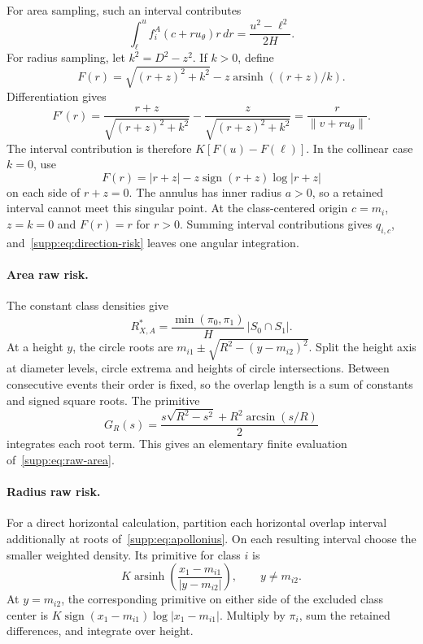 For area sampling, such an interval contributes
\begin{equation}
 \int_\ell^u f_i^A(c+ru_\theta)r\,dr
 =\frac{u^2-\ell^2}{2H}.
 \label{supp:eq:area-primitive}
\end{equation}
For radius sampling, let $k^2=D^2-z^2$. If $k>0$, define
\begin{equation}
 F(r)=\sqrt{(r+z)^2+k^2}
       -z\operatorname{arsinh}((r+z)/k).
 \label{supp:eq:radius-primitive}
\end{equation}
Differentiation gives
\[
 F'(r)=\frac{r+z}{\sqrt{(r+z)^2+k^2}}
        -\frac z{\sqrt{(r+z)^2+k^2}}
       =\frac r{\|v+ru_\theta\|}.
\]
The interval contribution is therefore $K[F(u)-F(\ell)]$. In the collinear case $k=0$, use
\begin{equation}
 F(r)=|r+z|-z\operatorname{sign}(r+z)\log|r+z|
 \label{supp:eq:collinear-primitive}
\end{equation}
on each side of $r+z=0$. The annulus has inner radius $a>0$, so a retained interval cannot meet this singular point. At the class-centered origin $c=m_i$, $z=k=0$ and $F(r)=r$ for $r>0$. Summing interval contributions gives $q_{i,c}$, and~\eqref{supp:eq:direction-risk} leaves one angular integration.

\paragraph{Area raw risk.}
The constant class densities give
\begin{equation}
 R_{X,A}^*=\frac{\min(\pi_0,\pi_1)}H\,|S_0\cap S_1|.
 \label{supp:eq:raw-area}
\end{equation}
At a height $y$, the circle roots are $m_{i1}\pm\sqrt{R^2-(y-m_{i2})^2}$. Split the height axis at diameter levels, circle extrema and heights of circle intersections. Between consecutive events their order is fixed, so the overlap length is a sum of constants and signed square roots. The primitive
\begin{equation}
 G_R(s)=\frac{s\sqrt{R^2-s^2}+R^2\arcsin(s/R)}2
 \label{supp:eq:circle-area-primitive}
\end{equation}
integrates each root term. This gives an elementary finite evaluation of~\eqref{supp:eq:raw-area}.

\paragraph{Radius raw risk.}
For a direct horizontal calculation, partition each horizontal overlap interval additionally at roots of~\eqref{supp:eq:apollonius}. On each resulting interval choose the smaller weighted density. Its primitive for class $i$ is
\begin{equation}
 K\operatorname{arsinh}\!\left(\frac{x_1-m_{i1}}{|y-m_{i2}|}\right),
 \qquad y\ne m_{i2}.
 \label{supp:eq:horizontal-radius}
\end{equation}
At $y=m_{i2}$, the corresponding primitive on either side of the excluded class center is $K\operatorname{sign}(x_1-m_{i1})\log|x_1-m_{i1}|$. Multiply by $\pi_i$, sum the retained differences, and integrate over height.

